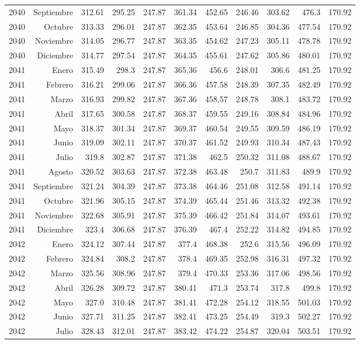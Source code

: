 \documentclass{article}%
\begin{document}
\begin{longtable}{|l r|r|r|r|r|r|r|r|r|r|}
2040&Septiembre&312.61&295.25&247.87&361.34&452.65&246.46&303.62&476.3&170.92\\%
2040&Octubre&313.33&296.01&247.87&362.35&453.64&246.85&304.36&477.54&170.92\\%
2040&Noviembre&314.05&296.77&247.87&363.35&454.62&247.23&305.11&478.78&170.92\\%
2040&Diciembre&314.77&297.54&247.87&364.35&455.61&247.62&305.86&480.01&170.92\\%
2041&Enero&315.49&298.3&247.87&365.36&456.6&248.01&306.6&481.25&170.92\\%
2041&Febrero&316.21&299.06&247.87&366.36&457.58&248.39&307.35&482.49&170.92\\%
2041&Marzo&316.93&299.82&247.87&367.36&458.57&248.78&308.1&483.72&170.92\\%
2041&Abril&317.65&300.58&247.87&368.37&459.55&249.16&308.84&484.96&170.92\\%
2041&Mayo&318.37&301.34&247.87&369.37&460.54&249.55&309.59&486.19&170.92\\%
2041&Junio&319.09&302.11&247.87&370.37&461.52&249.93&310.34&487.43&170.92\\%
2041&Julio&319.8&302.87&247.87&371.38&462.5&250.32&311.08&488.67&170.92\\%
2041&Agosto&320.52&303.63&247.87&372.38&463.48&250.7&311.83&489.9&170.92\\%
2041&Septiembre&321.24&304.39&247.87&373.38&464.46&251.08&312.58&491.14&170.92\\%
2041&Octubre&321.96&305.15&247.87&374.39&465.44&251.46&313.32&492.38&170.92\\%
2041&Noviembre&322.68&305.91&247.87&375.39&466.42&251.84&314.07&493.61&170.92\\%
2041&Diciembre&323.4&306.68&247.87&376.39&467.4&252.22&314.82&494.85&170.92\\%
2042&Enero&324.12&307.44&247.87&377.4&468.38&252.6&315.56&496.09&170.92\\%
2042&Febrero&324.84&308.2&247.87&378.4&469.35&252.98&316.31&497.32&170.92\\%
2042&Marzo&325.56&308.96&247.87&379.4&470.33&253.36&317.06&498.56&170.92\\%
2042&Abril&326.28&309.72&247.87&380.41&471.3&253.74&317.8&499.8&170.92\\%
2042&Mayo&327.0&310.48&247.87&381.41&472.28&254.12&318.55&501.03&170.92\\%
2042&Junio&327.71&311.25&247.87&382.41&473.25&254.49&319.3&502.27&170.92\\%
2042&Julio&328.43&312.01&247.87&383.42&474.22&254.87&320.04&503.51&170.92\\%

\end{longtable}
\end{document}
